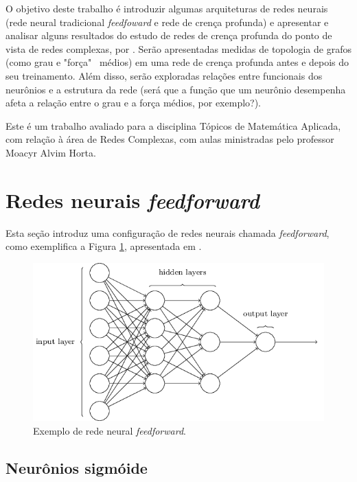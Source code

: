 \documentclass{article}
\begin{document}
        O objetivo deste trabalho é introduzir algumas arquiteturas de redes neurais (rede neural tradicional \textit{feedfoward} e rede de crença profunda)
        e apresentar e analisar alguns resultados do estudo de redes de crença profunda do ponto de vista de redes complexas, por \cite{testolin2018deep}.
        Serão apresentadas medidas de topologia de grafos (como grau e "força" \ médios) em uma rede de crença profunda antes e depois do seu treinamento.
        Além disso, serão exploradas relações entre funcionais dos neurônios e a estrutura da rede (será que a função que um neurônio desempenha afeta a relação entre o grau e a força médios, por exemplo?).

        Este é um trabalho avaliado para a disciplina Tópicos de Matemática Aplicada, com relação à área de Redes Complexas, com aulas ministradas pelo professor Moacyr Alvim Horta.

    \section{Redes neurais \textit{feedforward}}
        \label{feedforward}

        Esta seção introduz uma configuração de redes neurais chamada \textit{feedforward}, como exemplifica a Figura \ref{fig1}, apresentada em \cite{nielsen2015neural}.

        \begin{figure}[h!]
            \centering
            \includegraphics[scale=0.5]{Images/Feedforward neural network.png}
            \caption{Exemplo de rede neural \textit{feedforward}.}
            \label{fig1}
        \end{figure}        

        \subsection{Neurônios sigmóide}
\end{document}
